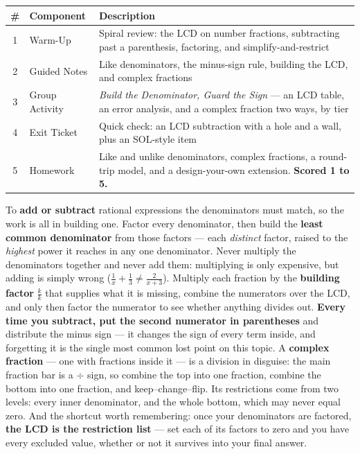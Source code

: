\documentclass[10pt]{article}
\begin{document}
\begin{tocbox}
\small
\renewcommand{\arraystretch}{1.5}
\begin{tabularx}{\linewidth}{@{} c l X @{}}
\rowcolor{forestbg}
\textbf{\#} & \textbf{Component} & \textbf{Description} \\
\midrule
1 & Warm-Up        & Spiral review: the LCD on number fractions, subtracting past a parenthesis, factoring, and simplify-and-restrict \\
2 & Guided Notes   & Like denominators, the minus-sign rule, building the LCD, and complex fractions \\
3 & Group Activity & \emph{Build the Denominator, Guard the Sign} --- an LCD table, an error analysis, and a complex fraction two ways, by tier \\
4 & Exit Ticket    & Quick check: an LCD subtraction with a hole and a wall, plus an SOL-style item \\
5 & Homework       & Like and unlike denominators, complex fractions, a round-trip model, and a design-your-own extension. \textbf{Scored 1 to 5.} \\
\end{tabularx}
\end{tocbox}

\vspace{0.10in}

\begin{remindbox}
\small To \textbf{add or subtract} rational expressions the denominators must match, so the work is all
in building one. Factor every denominator, then build the \textbf{least common denominator} from those
factors --- each \emph{distinct} factor, raised to the \emph{highest} power it reaches in any one
denominator. Never multiply the denominators together and never add them: multiplying is only
expensive, but adding is simply wrong ($\frac1x+\frac13\neq\frac{2}{x+3}$). Multiply each fraction by
the \textbf{building factor} $\frac kk$ that supplies what it is missing, combine the numerators over
the LCD, and only then factor the numerator to see whether anything divides out. \textbf{Every time you
subtract, put the second numerator in parentheses} and distribute the minus sign --- it changes the
sign of every term inside, and forgetting it is the single most common lost point on this topic. A
\textbf{complex fraction} --- one with fractions inside it --- is a division in disguise: the main
fraction bar is a $\div$ sign, so combine the top into one fraction, combine the bottom into one
fraction, and keep--change--flip. Its restrictions come from two levels: every inner denominator, and
the whole bottom, which may never equal zero. And the shortcut worth remembering: once your denominators
are factored, \textbf{the LCD is the restriction list} --- set each of its factors to zero and you have
every excluded value, whether or not it survives into your final answer.
\end{remindbox}
\end{document}
